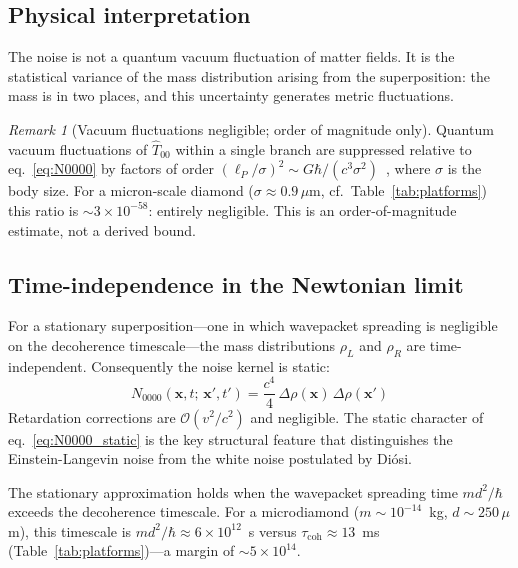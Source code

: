 \documentclass[12pt,a4paper]{article}
\theoremstyle{remark}
\newtheorem{remark}{Remark}
\begin{document}
\subsection{Physical interpretation}

The noise is not a quantum vacuum fluctuation of matter fields. It is the statistical
variance of the mass distribution arising from the superposition: the mass is in two
places, and this uncertainty generates metric fluctuations.

\begin{remark}[Vacuum fluctuations negligible; order of magnitude only]
\label{rem:vacuum}
Quantum vacuum fluctuations of $\hat{T}_{00}$ within a single branch are suppressed
relative to eq.~\eqref{eq:N0000} by factors of order
$(\ell_P/\sigma)^2 \sim G\hbar/(c^3\sigma^2)$~\cite{phillips_hu}, where $\sigma$ is the
body size. For a micron-scale diamond ($\sigma \approx 0.9\,\mu\text{m}$, cf.\
Table~\ref{tab:platforms}) this ratio is $\sim 3\times10^{-58}$: entirely negligible.
This is an order-of-magnitude estimate, not a derived bound.
\end{remark}

\subsection{Time-independence in the Newtonian limit}

For a stationary superposition---one in which wavepacket spreading is negligible on the
decoherence timescale---the mass distributions $\rho_L$ and $\rho_R$ are
time-independent. Consequently the noise kernel is static:
\begin{equation}
N_{0000}(\mathbf{x},t;\,\mathbf{x}',t') = \frac{c^4}{4}\,\Delta\rho(\mathbf{x})\,\Delta\rho(\mathbf{x}')
\label{eq:N0000_static}
\end{equation}
Retardation corrections are $\mathcal{O}(v^2/c^2)$ and negligible. The static character
of eq.~\eqref{eq:N0000_static} is the key structural feature that distinguishes the
Einstein-Langevin noise from the white noise postulated by Di\'osi.

The stationary approximation holds when the wavepacket spreading time $md^2/\hbar$ exceeds
the decoherence timescale. For a microdiamond ($m \sim 10^{-14}$~kg, $d \sim 250\,\mu$m),
this timescale is $md^2/\hbar \approx 6\times10^{12}$~s versus $\tau_{\text{coh}} \approx
13$~ms (Table~\ref{tab:platforms})---a margin of $\sim 5\times10^{14}$.

\end{document}
